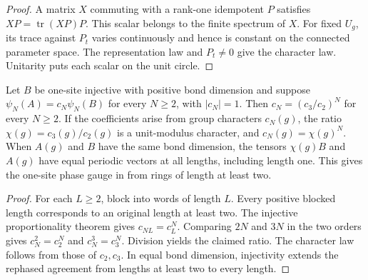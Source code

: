 \begin{proof}\leanok
    A matrix $X$ commuting with a rank-one idempotent $P$ satisfies
    $XP=\operatorname{tr}(XP)P$. This scalar belongs to the finite
    spectrum of $X$. For fixed $U_g$, its trace against $P_t$ varies
    continuously and hence is constant on the connected parameter space.
    The representation law and $P_t\ne0$ give the character law.
    Unitarity puts each scalar on the unit circle.
\end{proof}

\begin{lemma}
    \label{thm:spt_character_from_positive_lengths}
    \leanok
    Let $B$ be one-site injective with positive bond dimension and suppose
    $\psi_N(A)=c_N\psi_N(B)$ for every $N\ge2$, with $|c_N|=1$.
    Then $c_N=(c_3/c_2)^N$ for every $N\ge2$.
    If the coefficients arise from group characters $c_N(g)$, the ratio
    $\chi(g)=c_3(g)/c_2(g)$ is a unit-modulus character, and
    $c_N(g)=\chi(g)^N$.
    When $A(g)$ and $B$ have the same bond dimension, the tensors
    $\chi(g)B$ and $A(g)$ have equal periodic vectors at all lengths,
    including length one. This gives the one-site phase gauge in
    \cite[Appendix~B]{Schuch2011Phases} from rings of length at least two.
\end{lemma}

\begin{proof}\leanok
    For each $L\ge2$, block into words of length $L$. Every positive
    blocked length corresponds to an original length at least two.
    The injective proportionality theorem gives $c_{NL}=c_L^N$.
    Comparing $2N$ and $3N$ in the two orders gives
    $c_N^2=c_2^N$ and $c_N^3=c_3^N$. Division yields the claimed ratio.
    The character law follows from those of $c_2,c_3$.
    In equal bond dimension, injectivity extends the rephased agreement
    from lengths at least two to every length.
\end{proof}

